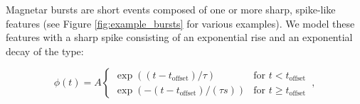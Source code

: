 \documentclass[12pt]{emulateapj}
\newcommand{\given}{\,|\,}
\newcommand{\dd}{\mathrm{d}}
\newcommand{\counts}{y}
\newcommand{\pars}{\theta}
\newcommand{\mean}{\lambda}
\newcommand{\Poisson}{{\mathcal P}}
\newcommand{\bg}{\mathrm{bg}}
\newcommand{\word}{\phi}
\begin{document}
Magnetar bursts are short events composed of one or more sharp, spike-like features (see Figure \ref{fig:example_bursts} for various examples). We model these features
with a sharp spike consisting of an exponential rise and an exponential decay of the type:


\begin{equation}
\word(t) = A \left\{\begin{array}{ll}\exp((t-t_{\mathrm{offset}})/\tau) & \mbox{for $t < t_{\mathrm{offset}}$}\\ 
\exp(-(t-t_{\mathrm{offset}})/(\tau s)) & \mbox{for $t \geq t_\mathrm{offset}$}\end{array}\right. \, ,
\label{eqn:word}
\end{equation}
\end{document}
